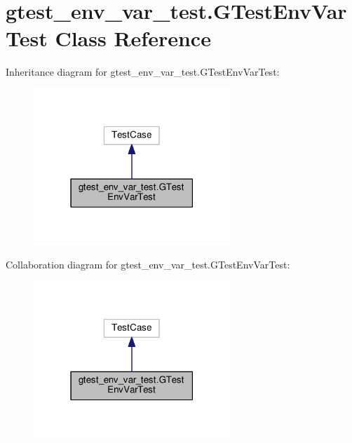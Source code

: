 \hypertarget{classgtest__env__var__test_1_1GTestEnvVarTest}{}\section{gtest\+\_\+env\+\_\+var\+\_\+test.\+G\+Test\+Env\+Var\+Test Class Reference}
\label{classgtest__env__var__test_1_1GTestEnvVarTest}


Inheritance diagram for gtest\+\_\+env\+\_\+var\+\_\+test.\+G\+Test\+Env\+Var\+Test\+:
\nopagebreak
\begin{figure}[H]
\begin{center}
\leavevmode
\includegraphics[width=210pt]{classgtest__env__var__test_1_1GTestEnvVarTest__inherit__graph}
\end{center}
\end{figure}


Collaboration diagram for gtest\+\_\+env\+\_\+var\+\_\+test.\+G\+Test\+Env\+Var\+Test\+:
\nopagebreak
\begin{figure}[H]
\begin{center}
\leavevmode
\includegraphics[width=210pt]{classgtest__env__var__test_1_1GTestEnvVarTest__coll__graph}
\end{center}
\end{figure}
